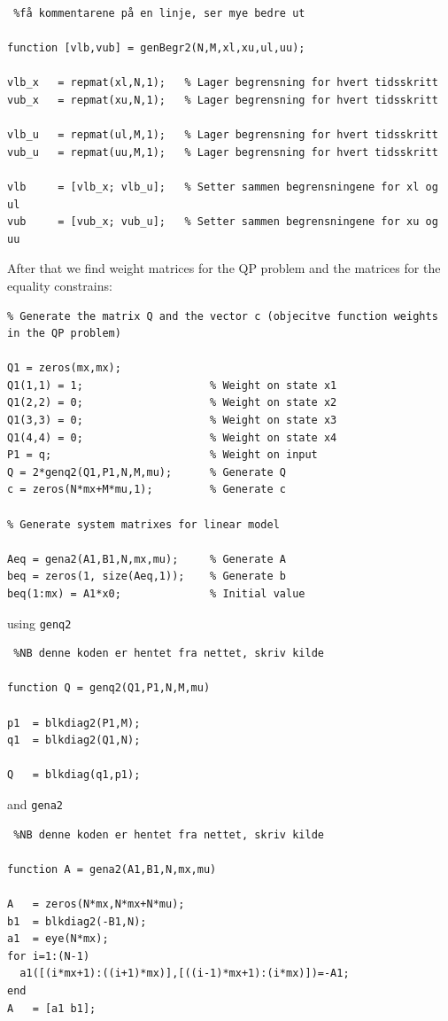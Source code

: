 \newline
\begin{lstlisting} %få kommentarene på en linje, ser mye bedre ut

function [vlb,vub] = genBegr2(N,M,xl,xu,ul,uu);

vlb_x	= repmat(xl,N,1);	% Lager begrensning for hvert tidsskritt
vub_x	= repmat(xu,N,1);	% Lager begrensning for hvert tidsskritt

vlb_u	= repmat(ul,M,1);	% Lager begrensning for hvert tidsskritt
vub_u	= repmat(uu,M,1);	% Lager begrensning for hvert tidsskritt

vlb	    = [vlb_x; vlb_u];	% Setter sammen begrensningene for xl og ul
vub	    = [vub_x; vub_u];	% Setter sammen begrensningene for xu og uu
\end{lstlisting}

After that we find weight matrices for the QP problem and the matrices for the equality constrains:
\begin{lstlisting}
% Generate the matrix Q and the vector c (objecitve function weights in the QP problem) 

Q1 = zeros(mx,mx);
Q1(1,1) = 1;                	% Weight on state x1
Q1(2,2) = 0;                	% Weight on state x2
Q1(3,3) = 0;                	% Weight on state x3
Q1(4,4) = 0;                	% Weight on state x4
P1 = q;                     	% Weight on input
Q = 2*genq2(Q1,P1,N,M,mu);  	% Generate Q
c = zeros(N*mx+M*mu,1);     	% Generate c

% Generate system matrixes for linear model

Aeq = gena2(A1,B1,N,mx,mu); 	% Generate A
beq = zeros(1, size(Aeq,1));	% Generate b
beq(1:mx) = A1*x0; 	        	% Initial value
\end{lstlisting}
using \texttt{genq2} 

\begin{lstlisting} %NB denne koden er hentet fra nettet, skriv kilde

function Q = genq2(Q1,P1,N,M,mu)

p1	= blkdiag2(P1,M);
q1	= blkdiag2(Q1,N);

Q	= blkdiag(q1,p1); 
\end{lstlisting}
and \texttt{gena2}

\begin{lstlisting} %NB denne koden er hentet fra nettet, skriv kilde

function A = gena2(A1,B1,N,mx,mu)

A 	= zeros(N*mx,N*mx+N*mu);
b1	= blkdiag2(-B1,N);
a1	= eye(N*mx);
for i=1:(N-1)
  a1([(i*mx+1):((i+1)*mx)],[((i-1)*mx+1):(i*mx)])=-A1;
end
A	= [a1 b1];
\end{lstlisting}

